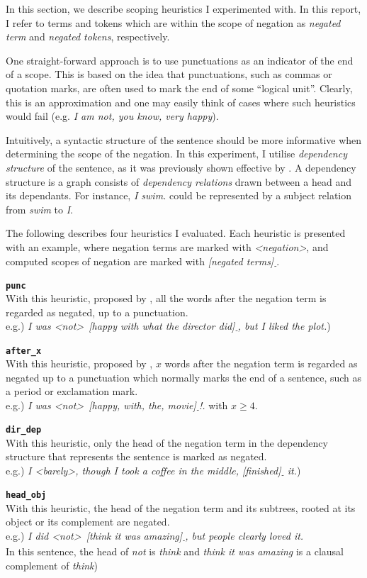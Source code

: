 In this section, we describe scoping heuristics I experimented with. In this report, I refer to terms and tokens which are within the scope of negation as \emph{negated term} and \emph{negated tokens}, respectively. 

One straight-forward approach is to use punctuations as an indicator of the end of a scope. This is based on the idea that punctuations, such as commas or quotation marks, are often used to mark the end of some ``logical unit''. Clearly, this is an approximation and one may easily think of cases where such heuristics would fail (e.g. \textit{I am not, you know, very happy}).

Intuitively, a syntactic structure of the sentence should be more informative when determining the scope of the negation. In this experiment, I utilise \emph{dependency structure} of the sentence, as it was previously shown effective by \cite{jia2009effect}. A dependency structure is a graph consists of \emph{dependency relations} drawn between a head and its dependants. For instance, \textit{I swim.} could be represented by a subject relation from \textit{swim} to \textit{I}. 

The following describes four heuristics I evaluated. Each heuristic is presented with an example, where negation terms are marked with \textit{\textless negation\textgreater}, and computed scopes of negation are marked with \textit{[negated terms]\textsubscript{-}}.

{\bf \texttt{punc}}\\
With this heuristic, proposed by \cite{pang2002thumbs}, all the words after the negation term is regarded as negated, up to a punctuation.\\
e.g.) \textit{I was \textless not\textgreater\ [happy with what the director did]\textsubscript{-}, but I liked the plot.}) 

{\bf \texttt{after\_x}}\\
With this heuristic, proposed by \cite{hu2004mining}, $x$ words after the negation term is regarded as negated up to a punctuation which normally marks the end of a sentence, such as a period or exclamation mark.\\
e.g.) \textit{I was \textless not\textgreater\ [happy, with, the, movie]\textsubscript{-}!.} with $x \geq 4$.

{\bf \texttt{dir\_dep}}\\
With this heuristic, only the head of the negation term in the dependency structure that represents the sentence is marked as negated.\\
e.g.) \textit{I \textless barely\textgreater, though I took a coffee in the middle, [finished]\textsubscript{-} it.})

{\bf \texttt{head\_obj}}\\
With this heuristic, the head of the negation term and its subtrees, rooted at its object or its complement are negated.\\
e.g.) \textit{I did \textless not\textgreater\ [think it was amazing]\textsubscript{-}, but people clearly loved it.}\\
In this sentence, the head of \textit{not} is \textit{think} and \textit{think it was amazing} is a clausal complement of \textit{think})

